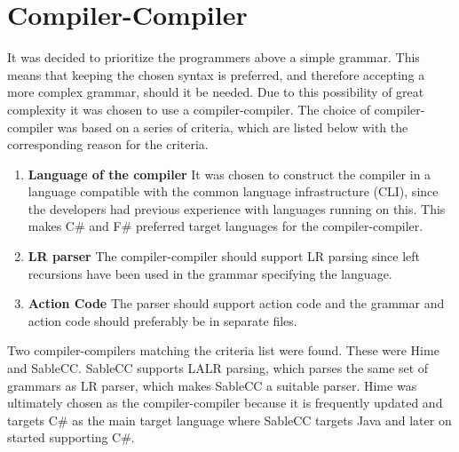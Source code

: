 \section{Compiler-Compiler}
\label{sec:compiler_compiler_choice}

It was decided to prioritize the programmers above a simple grammar. This means that keeping the chosen syntax is preferred, and therefore accepting a more complex grammar, should it be needed. Due to this possibility of great complexity it was chosen to use a compiler-compiler. The choice of compiler-compiler was based on a series of criteria, which are listed below with the corresponding reason for the criteria.

\begin{enumerate}
\item \textbf{Language of the compiler} It was chosen to construct the compiler in a language compatible with the common language infrastructure (CLI), since the developers had previous experience with languages running on this. This makes C\# and F\# preferred target languages for the compiler-compiler.

\item \textbf{LR parser} The compiler-compiler should support LR parsing since left recursions have been used in the grammar specifying the language.\\

\item \textbf{Action Code} The parser should support action code and the grammar and action code should preferably be in separate files.\\

\end{enumerate}

Two compiler-compilers matching the criteria list were found. These were Hime and SableCC. SableCC supports LALR parsing, which parses the same set of grammars as LR parser, which makes SableCC a suitable parser. Hime was ultimately chosen as the compiler-compiler because it is frequently updated and targets C\# as the main target language where SableCC targets Java and later on started supporting C\#.
